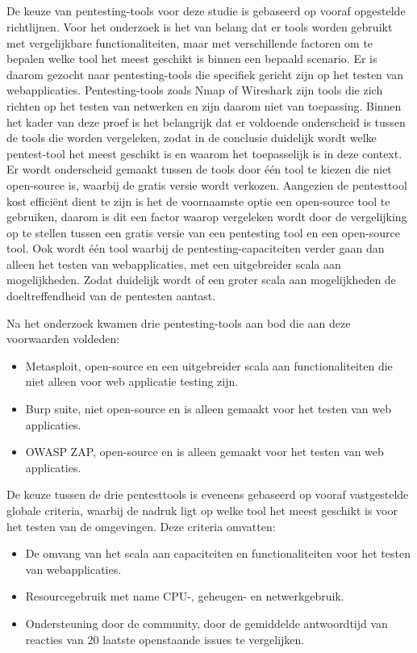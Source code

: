 \subsection{}
De keuze van pentesting-tools voor deze studie is gebaseerd op vooraf opgestelde richtlijnen. Voor het onderzoek is het van 
belang dat er tools worden gebruikt met vergelijkbare functionaliteiten, maar met verschillende factoren om te bepalen welke 
tool het meest geschikt is binnen een bepaald scenario. Er is daarom gezocht naar pentesting-tools die specifiek gericht zijn 
op het testen van webapplicaties. Pentesting-tools zoals Nmap of Wireshark zijn tools die zich richten op het testen van netwerken en  
zijn daarom niet van toepassing. Binnen het kader van deze proef is het belangrijk dat er voldoende onderscheid is tussen de tools 
die worden vergeleken, zodat in de conclusie duidelijk wordt welke pentest-tool het meest geschikt is en waarom het toepasselijk is in deze context. Er 
wordt onderscheid gemaakt tussen de tools door één tool te kiezen die niet open-source is, waarbij de gratis versie wordt 
verkozen. Aangezien de pentesttool kost efficiënt dient te zijn is het de voornaamste optie een open-source tool te gebruiken, daarom 
is dit een factor waarop vergeleken wordt door de vergelijking op te stellen tussen een gratis versie van een pentesting tool en een open-source tool. 
Ook wordt één tool waarbij de pentesting-capaciteiten verder gaan dan alleen het testen van webapplicaties, met een 
uitgebreider scala aan mogelijkheden. Zodat duidelijk wordt of een groter scala aan mogelijkheden de doeltreffendheid van de pentesten aantast.

Na het onderzoek kwamen drie pentesting-tools aan bod die aan deze voorwaarden voldeden:
\begin{itemize}
    \item Metasploit, open-source en een uitgebreider scala aan functionaliteiten die niet alleen voor web applicatie testing zijn.
    \item Burp suite, niet open-source en is alleen gemaakt voor het testen van web applicaties.
    \item OWASP ZAP, open-source en is alleen gemaakt voor het testen van web applicaties.
\end{itemize}


De keuze tussen de drie pentesttools is eveneens gebaseerd op vooraf vastgestelde globale criteria, waarbij de nadruk ligt op welke tool het meest 
geschikt is voor het testen van de omgevingen. Deze criteria omvatten:
\begin{itemize}
    \item De omvang van het scala aan capaciteiten en functionaliteiten voor het testen van webapplicaties.
    \item Resourcegebruik met name CPU-, geheugen- en netwerkgebruik.
    \item Ondersteuning door de community, door de gemiddelde antwoordtijd van reacties van 20 laatste openstaande issues te vergelijken.
\end{itemize}

